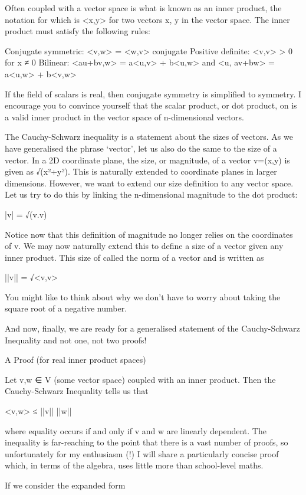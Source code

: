 Often coupled with a vector space is what is known as an inner product, the notation for which is <x,y> for two vectors x, y in the vector space. The inner product must satisfy the following rules:

Conjugate symmetric: <v,w> = <w,v> conjugate
Positive definite: <v,v> > 0 for x ≠ 0
Bilinear: <au+bv,w> = a<u,v> + b<u,w> and <u, av+bw> = a<u,w> + b<v,w>

If the field of scalars is real, then conjugate symmetry is simplified to symmetry. I encourage you to convince yourself that the scalar product, or dot product, on is a valid inner product in the vector space of n-dimensional vectors.

The Cauchy-Schwarz inequality is a statement about the sizes of vectors. As we have generalised the phrase ‘vector’, let us also do the same to the size of a vector. In a 2D coordinate plane, the size, or magnitude, of a vector v=(x,y) is given as √(x²+y²). This is naturally extended to coordinate planes in larger dimensions. However, we want to extend our size definition to any vector space. Let us try to do this by linking the n-dimensional magnitude to the dot product:

|v| = √(v.v)

Notice now that this definition of magnitude no longer relies on the coordinates of v. We may now naturally extend this to define a size of a vector given any inner product. This size of called the norm of a vector and is written as

||v|| = √<v,v>

You might like to think about why we don’t have to worry about taking the square root of a negative number.

And now, finally, we are ready for a generalised statement of the Cauchy-Schwarz Inequality and not one, not two proofs!

A Proof (for real inner product spaces)

Let v,w ∈ V (some vector space) coupled with an inner product. Then the Cauchy-Schwarz Inequality tells us that

<v,w> ≤ ||v|| ||w||

where equality occurs if and only if v and w are linearly dependent. The inequality is far-reaching to the point that there is a vast number of proofs, so unfortunately for my enthusiasm (!) I will share a particularly concise proof which, in terms of the algebra, uses little more than school-level maths.

If we consider the expanded form

